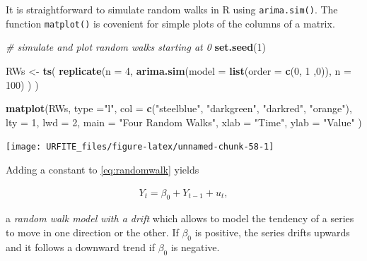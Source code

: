 \documentclass[]{book}
\newenvironment{Shaded}{\begin{snugshade}}{\end{snugshade}}
\newcommand{\KeywordTok}[1]{\textcolor[rgb]{0.13,0.29,0.53}{\textbf{#1}}}
\newcommand{\DataTypeTok}[1]{\textcolor[rgb]{0.13,0.29,0.53}{#1}}
\newcommand{\DecValTok}[1]{\textcolor[rgb]{0.00,0.00,0.81}{#1}}
\newcommand{\StringTok}[1]{\textcolor[rgb]{0.31,0.60,0.02}{#1}}
\newcommand{\CommentTok}[1]{\textcolor[rgb]{0.56,0.35,0.01}{\textit{#1}}}
\newcommand{\NormalTok}[1]{#1}
\theoremstyle{definition}
\theoremstyle{definition}
\theoremstyle{definition}
\theoremstyle{remark}
\begin{document}
It is straightforward to simulate random walks in R using
\texttt{arima.sim()}. The function \texttt{matplot()} is covenient for
simple plots of the columns of a matrix.

\begin{Shaded}
\begin{Highlighting}[]
\CommentTok{# simulate and plot random walks starting at 0}
\KeywordTok{set.seed}\NormalTok{(}\DecValTok{1}\NormalTok{)}

\NormalTok{RWs <-}\StringTok{ }\KeywordTok{ts}\NormalTok{(}
  \KeywordTok{replicate}\NormalTok{(}\DataTypeTok{n =} \DecValTok{4}\NormalTok{, }
            \KeywordTok{arima.sim}\NormalTok{(}\DataTypeTok{model =} \KeywordTok{list}\NormalTok{(}\DataTypeTok{order =} \KeywordTok{c}\NormalTok{(}\DecValTok{0}\NormalTok{, }\DecValTok{1}\NormalTok{ ,}\DecValTok{0}\NormalTok{)), }\DataTypeTok{n =} \DecValTok{100}\NormalTok{)}
\NormalTok{            )}
\NormalTok{  )}

\KeywordTok{matplot}\NormalTok{(RWs, }
        \DataTypeTok{type =}\StringTok{"l"}\NormalTok{, }
        \DataTypeTok{col =} \KeywordTok{c}\NormalTok{(}\StringTok{"steelblue"}\NormalTok{, }\StringTok{"darkgreen"}\NormalTok{, }\StringTok{"darkred"}\NormalTok{, }\StringTok{"orange"}\NormalTok{), }
        \DataTypeTok{lty =} \DecValTok{1}\NormalTok{, }
        \DataTypeTok{lwd =} \DecValTok{2}\NormalTok{,}
        \DataTypeTok{main =} \StringTok{"Four Random Walks"}\NormalTok{,}
        \DataTypeTok{xlab =} \StringTok{"Time"}\NormalTok{,}
        \DataTypeTok{ylab =} \StringTok{"Value"}
\NormalTok{        )}
\end{Highlighting}
\end{Shaded}

\begin{center}\texttt{[image: URFITE\_files/figure-latex/unnamed-chunk-58-1]} \end{center}

Adding a constant to \eqref{eq:randomwalk} yields

\begin{align}
  Y_t = \beta_0 + Y_{t-1} + u_t \label{eq:randomwalkdrift},
\end{align}

a \emph{random walk model with a drift} which allows to model the
tendency of a series to move in one direction or the other. If
\(\beta_0\) is positive, the series drifts upwards and it follows a
downward trend if \(\beta_0\) is negative.
\end{document}
